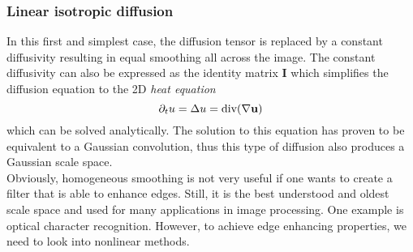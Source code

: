 \subsubsection*{Linear isotropic diffusion}
In this first and simplest case, the diffusion tensor is replaced by a constant diffusivity
resulting in equal smoothing all across the image. The constant diffusivity can also be expressed
as the identity matrix $\boldsymbol I$ which simplifies the diffusion equation to the 2D\textit{
heat equation}
\begin{equation}
    \partial_t u = \Delta u = \textnormal{div}(\mathbf{\nabla} \mathbf{u})\label{eq:IsoDiff}
\end{equation}
which can be solved analytically. The solution to this equation has proven to be equivalent to
a Gaussian convolution, thus this type of diffusion also produces a Gaussian scale space.\\
Obviously, homogeneous smoothing is not very useful if one wants to create a filter that is able to
enhance edges. Still, it is the best understood and oldest scale space and used for many
applications in image processing. One example is optical character recognition.
However, to achieve edge enhancing properties, we need to look into nonlinear methods.


